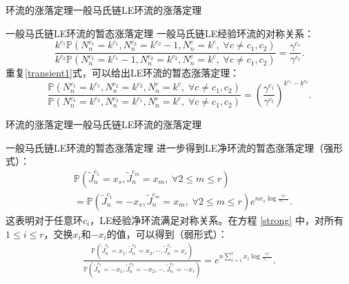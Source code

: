 \documentclass{beamer}
\newcommand{\Pnum}{\mathbb{P}}
\begin{document}
\begin{frame}{环流的涨落定理}{一般马氏链LE环流的涨落定理}
	\begin{block}{一般马氏链LE环流的暂态涨落定理}
		一般马氏链LE经验环流的对称关系：
		\begin{equation} \label{transient1}
			\frac{k^{c_1} \Pnum(N^{c_1}_n=k^{c_1},N^{c_2}_n=k^{c_2}-1,N^{c}_n=k^{c},\;\forall c\neq c_1,c_2)}
			{k^{c_2} \Pnum(N^{c_1}_n=k^{c_1} -1,N^{c_2}_n=k^{c_2},N^{c}_n=k^{c},\;\forall c\neq c_1,c_2)}
			= \frac{\gamma^{c_s}}{\gamma^{c_t}}.
		\end{equation}
		重复\ref{transient1}式，可以给出LE环流的暂态涨落定理：
		\begin{equation} \label{transient2}
			\frac{\Pnum(N^{c_1}_n=k^{c_1},N^{c_2}_n=k^{c_2},N^{c}_n=k^{c},\;\forall c\neq c_1,c_2)}
			{\Pnum(N^{c_1}_n=k^{c_2},N^{c_2}_n=k^{c_1},N^{c}_n=k^{c},\;\forall c\neq c_1,c_2)}
			= \left(\frac{\gamma^{c_1}}{\gamma^{c_t}}\right)^{k^{c_1}-k^{c_2}}.
		\end{equation}

	\end{block}
\end{frame}

\begin{frame}{环流的涨落定理}{一般马氏链LE环流的涨落定理}
	\begin{block}{一般马氏链LE环流的暂态涨落定理}
		进一步得到LE净环流的暂态涨落定理（强形式）：
		\begin{align*} \label{strong}
			 & \Pnum(\tilde{J}^{c_1}_n=x_s,\tilde{J}^{c_m}_n=x_m,\;\forall 2\le m \le r)                                                   \\
			 & = \Pnum(\tilde{J}^{c_1}_n=-x_s,\tilde{J}^{c_m}_n=x_m,\;\forall 2\le m \le r)e^{nx_s\log\frac{\gamma^{c_1}}{\gamma^{c_1-}}}.
		\end{align*}
		这表明对于任意环$c_i$，LE经验净环流满足对称关系。在方程 \ref{strong} 中，对所有$1\le i \le r$，交换$x_i$和$-x_i$的值，可以得到（弱形式）：
		\begin{equation}\label{weak1}
			\begin{split}
				\frac{\Pnum\left(\tilde{J}^{c_1}_n=x_1,\tilde{J}^{c_2}_n=x_2,\cdots,\tilde{J}^{c_{r}}_n=x_{r}\right)}
				{\Pnum\left(\tilde{J}^{c_1}_n=-x_1,\tilde{J}^{c_2}_n=-x_2,\cdots,\tilde{J}^{c_{r}}_n=-x_{r}\right)}
				=e^{n\sum_{i=1}^{r}x_i\log\frac{\gamma^{c_i}}{\gamma^{c_i-}}}.
			\end{split}
		\end{equation}
	\end{block}
\end{frame}
\end{document}
